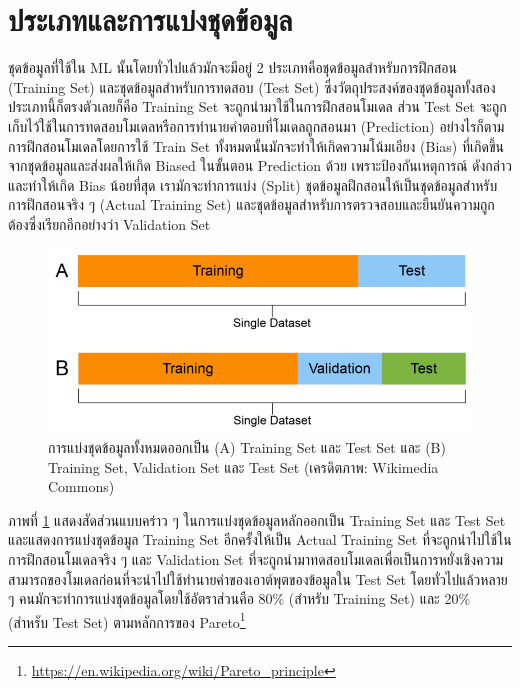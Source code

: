 \section{ประเภทและการแบ่งชุดข้อมูล}
\label{sec:split_dataset}

ชุดข้อมูลที่ใช้ใน ML นั้นโดยทั่วไปแล้วมักจะมีอยู่ 2 ประเภทคือชุดข้อมูลสำหรับการฝึกสอน (Training Set) และชุดข้อมูลสำหรับการทดสอบ 
(Test Set) ซึ่งวัตถุประสงค์ของชุดข้อมูลทั้งสองประเภทนี้ก็ตรงตัวเลยก็คือ Training Set จะถูกนำมาใช้ในการฝึกสอนโมเดล ส่วน Test Set 
จะถูกเก็บไว้ใช้ในการทดสอบโมเดลหรือการทำนายคำตอบที่โมเดลถูกสอนมา (Prediction) อย่างไรก็ตาม การฝึกสอนโมเดลโดยการใช้ Train Set 
ทั้งหมดนั้นมักจะทำให้เกิดความโน้มเอียง (Bias) ที่เกิดขึ้นจากชุดข้อมูลและส่งผลให้เกิด Biased ในขั้นตอน Prediction ด้วย เพราะป้องกันเหตุการณ์%
ดังกล่าวและทำให้เกิด Bias น้อยที่สุด เรามักจะทำการแบ่ง (Split) ชุดข้อมูลฝึกสอนให้เป็นชุดข้อมูลสำหรับการฝึกสอนจริง ๆ (Actual Training 
Set) และชุดข้อมูลสำหรับการตรวจสอบและยืนยันความถูกต้องซึ่งเรียกอีกอย่างว่า Validation Set

\begin{figure}[htbp]
    \centering
    \includegraphics[width=0.8\linewidth]{fig/dataset_splitting.png}
    \caption{การแบ่งชุดข้อมูลทั้งหมดออกเป็น (A) Training Set และ Test Set และ (B) Training Set, Validation Set และ 
    Test Set (เครดิตภาพ: Wikimedia Commons)}
    \label{fig:dataset_splitting}
\end{figure}

ภาพที่ \ref{fig:dataset_splitting} แสดงสัดส่วนแบบคร่าว ๆ ในการแบ่งชุดข้อมูลหลักออกเป็น Training Set และ Test Set 
และแสดงการแบ่งชุดข้อมูล Training Set อีกครั้งให้เป็น Actual Training Set ที่จะถูกนำไปใช้ในการฝึกสอนโมเดลจริง ๆ และ Validation 
Set ที่จะถูกนำมาทดสอบโมเดลเพื่อเป็นการหยั่งเชิงความสามารถของโมเดลก่อนที่จะนำไปใช้ทำนายค่าของเอาต์พุตของข้อมูลใน Test Set 
โดยทั่วไปแล้วหลาย ๆ คนมักจะทำการแบ่งชุดข้อมูลโดยใช้อัตราส่วนคือ 80\% (สำหรับ Training Set) และ 20\% (สำหรับ Test Set) 
ตามหลักการของ Pareto\footnote{\url{https://en.wikipedia.org/wiki/Pareto_principle}}

